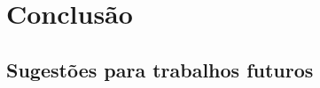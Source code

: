 \chapter{Conclusão} \label{Conclusao}

\section{Sugestões para trabalhos futuros} \label{Sugestoes}
